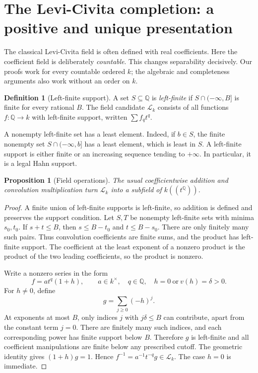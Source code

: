 \documentclass[11pt]{article}
\numberwithin{equation}{section}
\newtheorem{proposition}[proposition]{Proposition}
\theoremstyle{definition}
\newtheorem{definition}[definition]{Definition}
\theoremstyle{remark}
\newcommand{\Q}{\mathbb Q}
\newcommand{\Lk}{\mathcal L_k}
\begin{document}
\section{The Levi-Civita completion: a positive and unique presentation}
\label{pma:ser:sec:lc}

The classical Levi-Civita field is often defined with real coefficients.
Here the coefficient field is deliberately \emph{countable}. This changes
separability decisively. Our proofs work for every countable ordered $k$;
the algebraic and completeness arguments also work without an order on $k$.

\begin{definition}[Left-finite support]
A set $S\subseteq\Q$ is \emph{left-finite} if
$S\cap(-\infty,B]$ is finite for every rational $B$.
The field candidate $\Lk$ consists of all functions $f:\Q\to k$ with
left-finite support, written $\sum f_qt^q$.
\end{definition}

A nonempty left-finite set has a least element. Indeed, if $b\in S$, the
finite nonempty set $S\cap(-\infty,b]$ has a least element, which is least
in $S$. A left-finite support is either finite or an increasing sequence
tending to $+\infty$. In particular, it is a legal Hahn support.

\begin{proposition}[Field operations]\label{pma:ser:prop:lcfield}
The usual coefficientwise addition and convolution multiplication turn
$\Lk$ into a subfield of $k((t^\Q))$.
\end{proposition}
\begin{proof}
A finite union of left-finite supports is left-finite, so addition is defined
and preserves the support condition. Let $S,T$ be nonempty left-finite sets
with minima $s_0,t_0$. If $s+t\leq B$, then
$s\leq B-t_0$ and $t\leq B-s_0$. There are only finitely many such pairs.
Thus convolution coefficients are finite sums, and the product has left-finite
support. The coefficient at the least exponent of a nonzero product is the
product of the two leading coefficients, so the product is nonzero.

Write a nonzero series in the form
\[
 f=a t^q(1+h),\qquad a\in k^\times,\quad q\in\Q,
 \quad h=0\ \text{or}\ v(h)=\delta>0.
\]
For $h\ne0$, define
\[
 g=\sum_{j\geq0}(-h)^j.
\]
At exponents at most $B$, only indices $j$ with $j\delta\leq B$ can
contribute, apart from the constant term $j=0$. There are finitely many such
indices, and each corresponding power has finite support below $B$.
Therefore $g$ is left-finite and all coefficient manipulations are finite
below any prescribed cutoff. The geometric identity gives $(1+h)g=1$.
Hence $f^{-1}=a^{-1}t^{-q}g\in\Lk$. The case $h=0$ is immediate.
\end{proof}
\end{document}
